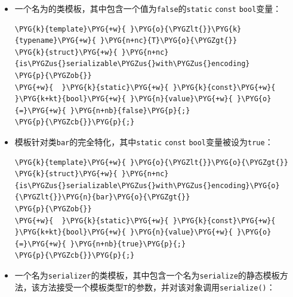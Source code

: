 \begin{itemize}
\item 一个名为的类模板，其中包含一个值为\texttt{false}的\texttt{static} \texttt{const} \texttt{bool}变量：



\begin{codeblockbg}
\begin{Verbatim}[commandchars=\\\{\},breaklines=true,breakanywhere=true,fontsize=\codefont,xleftmargin=17bp]
\PYG{k}{template}\PYG{+w}{ }\PYG{o}{\PYGZlt{}}\PYG{k}{typename}\PYG{+w}{ }\PYG{n+nc}{T}\PYG{o}{\PYGZgt{}}
\PYG{k}{struct}\PYG{+w}{ }\PYG{n+nc}{is\PYGZus{}serializable\PYGZus{}with\PYGZus{}encoding}
\PYG{p}{\PYGZob{}}
\PYG{+w}{  }\PYG{k}{static}\PYG{+w}{ }\PYG{k}{const}\PYG{+w}{ }\PYG{k+kt}{bool}\PYG{+w}{ }\PYG{n}{value}\PYG{+w}{ }\PYG{o}{=}\PYG{+w}{ }\PYG{n+nb}{false}\PYG{p}{;}
\PYG{p}{\PYGZcb{}}\PYG{p}{;}
\end{Verbatim}
\end{codeblockbg}



\item {}模板针对类\texttt{bar}的完全特化，其中\texttt{static} \texttt{const} \texttt{bool}变量被设为\texttt{true}：



\begin{codeblockbg}
\begin{Verbatim}[commandchars=\\\{\},breaklines=true,breakanywhere=true,fontsize=\codefont,xleftmargin=17bp]
\PYG{k}{template}\PYG{+w}{ }\PYG{o}{\PYGZlt{}}\PYG{o}{\PYGZgt{}}
\PYG{k}{struct}\PYG{+w}{ }\PYG{n+nc}{is\PYGZus{}serializable\PYGZus{}with\PYGZus{}encoding}\PYG{o}{\PYGZlt{}}\PYG{n}{bar}\PYG{o}{\PYGZgt{}}
\PYG{p}{\PYGZob{}}
\PYG{+w}{  }\PYG{k}{static}\PYG{+w}{ }\PYG{k}{const}\PYG{+w}{ }\PYG{k+kt}{bool}\PYG{+w}{ }\PYG{n}{value}\PYG{+w}{ }\PYG{o}{=}\PYG{+w}{ }\PYG{n+nb}{true}\PYG{p}{;}
\PYG{p}{\PYGZcb{}}\PYG{p}{;}
\end{Verbatim}
\end{codeblockbg}



\item 一个名为\texttt{serializer}的类模板，其中包含一个名为\texttt{serialize}的静态模板方法，该方法接受一个模板类型\texttt{T}的参数，并对该对象调用\texttt{serialize()}：



\end{itemize}
